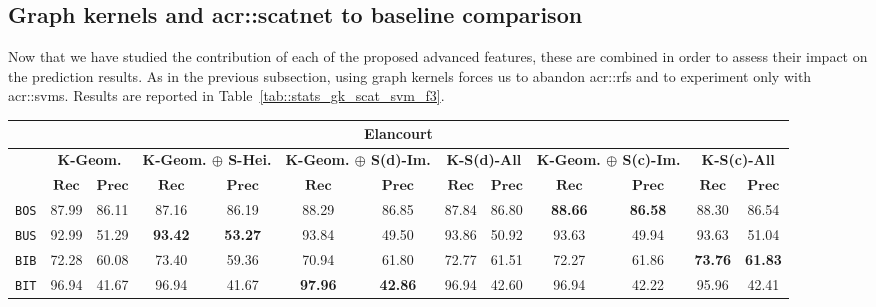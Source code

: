     \subsection{Graph kernels and \texorpdfstring{\acrshort*{acr::scatnet}}{ScatNet} to baseline comparison}
        \label{subsec::advanced_experiments::better_features::graph_kernel_scatnet_baseline}
        Now that we have studied the contribution of each of the proposed advanced features, these are combined in order to assess their impact on the prediction results.
        As in the previous subsection, using graph kernels forces us to abandon \glspl{acr::rf} and to experiment only with \glspl{acr::svm}.
        Results are reported in Table~\ref{tab::stats_gk_scat_svm_f3}.\\
        
        \begin{sidewaystable}[htpb]
            \footnotesize
            \begin{tabular}{| c | c c | c c | c c | c c | c c | c c |}
                \hline
                \multicolumn{13}{|c|}{\textbf{Elancourt}}\\
                \hline
                &\multicolumn{2}{c|}{\textbf{K-Geom.}} & \multicolumn{2}{c|}{\textbf{K-Geom. \(\oplus\) S-Hei.}} & \multicolumn{2}{c|}{\textbf{K-Geom. \(\oplus\) S(d)-Im.}} & \multicolumn{2}{c|}{\textbf{K-S(d)-All}} & \multicolumn{2}{c|}{\textbf{K-Geom. \(\oplus\) S(c)-Im.}} & \multicolumn{2}{c|}{\textbf{K-S(c)-All}}\\
                \cline{2-13}
                & \(\bm{Rec}\) & \(\bm{Prec}\) &  \(\bm{Rec}\) & \(\bm{Prec}\) &  \(\bm{Rec}\) & \(\bm{Prec}\) &  \(\bm{Rec}\) & \(\bm{Prec}\) &  \(\bm{Rec}\) & \(\bm{Prec}\) &  \(\bm{Rec}\) & \(\bm{Prec}\) \\
                \hline
                \texttt{BOS} & 87.99 & 86.11 & 87.16 & 86.19 & 88.29 & 86.85 & 87.84 & 86.80 & \textbf{88.66} & \textbf{86.58} & 88.30 & 86.54 \\
                \hline
                \texttt{BUS} & 92.99 & 51.29 & \textbf{93.42} & \textbf{53.27} & 93.84 & 49.50 & 93.86 & 50.92 & 93.63 & 49.94 & 93.63 & 51.04 \\
                \hline
                \texttt{BIB} & 72.28 & 60.08 & 73.40 & 59.36 & 70.94 & 61.80 & 72.77 & 61.51 & 72.27 & 61.86 & \textbf{73.76} & \textbf{61.83} \\
                \hline
                \texttt{BIT} & 96.94 & 41.67 & 96.94 & 41.67 & \textbf{97.96} & \textbf{42.86} & 96.94 & 42.60 & 96.94 & 42.22 & 95.96 & 42.41 \\

\end{tabular}
\end{sidewaystable}
